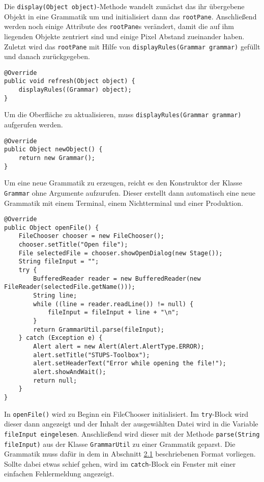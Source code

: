 Die \lstinline[columns=fixed]{display(Object object)}-Methode wandelt zunächst das ihr übergebene Objekt in eine Grammatik um und initialisiert dann das \lstinline[columns=fixed]{rootPane}. Anschließend werden noch einige Attribute des \lstinline[columns=fixed]{rootPane}s verändert, damit die auf ihm liegenden Objekte zentriert sind und einige Pixel Abstand zueinander haben. Zuletzt wird das \lstinline[columns=fixed]{rootPane} mit Hilfe von \lstinline[columns=fixed]{displayRules(Grammar grammar)} gefüllt und danach zurückgegeben.
\begin{lstlisting}[frame=single, basicstyle=\small, caption=Die Methode \textit{refresh}]
@Override
public void refresh(Object object) {
	displayRules((Grammar) object);
}
\end{lstlisting}
Um die Oberfläche zu aktualisieren, muss \lstinline[columns=fixed]{displayRules(Grammar grammar)} aufgerufen werden.
\begin{lstlisting}[frame=single, basicstyle=\small, caption=Die Methode \textit{newObject}]
@Override
public Object newObject() {
	return new Grammar();
}
\end{lstlisting}
Um eine neue Grammatik zu erzeugen, reicht es den Konstruktor der Klasse \lstinline[columns=fixed]{Grammar} ohne Argumente aufzurufen. Dieser erstellt dann automatisch eine neue Grammatik mit einem Terminal, einem Nichtterminal und einer Produktion.
\begin{lstlisting}[frame=single, basicstyle=\small, caption=Die Methode \textit{openFile}]
@Override
public Object openFile() {
	FileChooser chooser = new FileChooser();
	chooser.setTitle("Open file");
	File selectedFile = chooser.showOpenDialog(new Stage());
	String fileInput = "";
	try {
		BufferedReader reader = new BufferedReader(new FileReader(selectedFile.getName()));
		String line;
		while ((line = reader.readLine()) != null) {
			fileInput = fileInput + line + "\n";
		}
		return GrammarUtil.parse(fileInput);
	} catch (Exception e) {
		Alert alert = new Alert(Alert.AlertType.ERROR);
		alert.setTitle("STUPS-Toolbox");
		alert.setHeaderText("Error while opening the file!");
		alert.showAndWait();
		return null;
	}
}
\end{lstlisting}
In \lstinline[columns=fixed]{openFile()} wird zu Beginn ein FileChooser initialisiert. Im \lstinline[columns=fixed]{try}-Block wird dieser dann angezeigt und der Inhalt der ausgewählten Datei wird in die Variable \lstinline[columns=fixed]{fileInput eingelesen}. Anschließend wird dieser mit der Methode \lstinline[columns=fixed]{parse(String fileInput)} aus der Klasse \lstinline[columns=fixed]{GrammarUtil} zu einer Grammatik geparst. Die Grammatik muss dafür in dem in Abschnitt \hyperref[sec:2.1]{2.1} beschriebenen Format vorliegen. Sollte dabei etwas schief gehen, wird im \lstinline[columns=fixed]{catch}-Block ein Fenster mit einer einfachen Fehlermeldung angezeigt.
